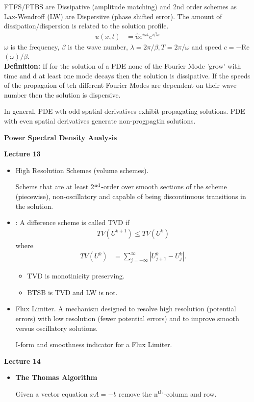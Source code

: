 \documentclass[10pt,a4paper]{report}
\begin{document}
\begin{description}
	\item FTFS/FTBS are Dissipative (amplitude matching) and 2nd order schemes as Lax-Wendroff (LW) are Dispersiive (phase shifted error).  The amount of dissipation/dispersion is related to the solution profile.
	\begin{align*}
		u(x,t) &= \hat{u}e^{i\omega t}e^{i\beta x}
	\end{align*}$\omega$ is the frequency, $\beta$ is the wave number, $\lambda = 2\pi/\beta, T = 2\pi/\omega$ and speed $c=-$Re$(\omega)/\beta$.\\
	
	\textbf{Definition: }If for the solution of a PDE none of the Fourier Mode 'grow' with time and d at least one mode decays then the solution is dissipative.  If the speeds of the propagaion of teh different Fourier Modes are dependent on their wave number then the solution is dispersive.
	
	In general, PDE wth odd spatial derivatives exhibit propagating solutions.  PDE with even spatial derivatives generate non-progpagtin solutions.
	
	\item \textbf{Power Spectral Density Analysis}
\end{description}

\newpage
\textbf{\Large{Lecture 13}}

\begin{itemize}
	\item High Resolution Schemes (volume schemes).
	
	Schems that are at least 2$\textsuperscript{nd}$-order over smooth sections of the scheme (piecewise), non-oscillatory and capable of being discontinuous transitions in the solution.
	
	\item {}: A difference scheme is called TVD if
	\begin{align*}
		TV(U^{k+1}) \le TV(U^k)
	\end{align*}where
	\begin{align*}
		TV(U^k) &= \sum_{j=-\infty}^{\infty} |U^k_{j+1}-U^k_j|.
	\end{align*}
	\begin{itemize}
		\item TVD is monotinicity preserving.
		\item BTSB is TVD and LW is not.
	\end{itemize}
	
	\item Flux Limiter.  A mechanism designed to resolve high resolution (potential errors) with low resolution (fewer potential errors) and to improve smooth versus oscillatory solutions.
	
	I-form and smoothness indicator for a Flux Limiter.
\end{itemize}

\HLINE
\textbf{\LARGE{Lecture 14}}

\begin{itemize}
	\item \textbf{The Thomas Algorithm}
	
	Given a vector equation $xA=-b$ remove the n$\textsuperscript{th}$-column and row.
	
\end{itemize}
\end{document}
